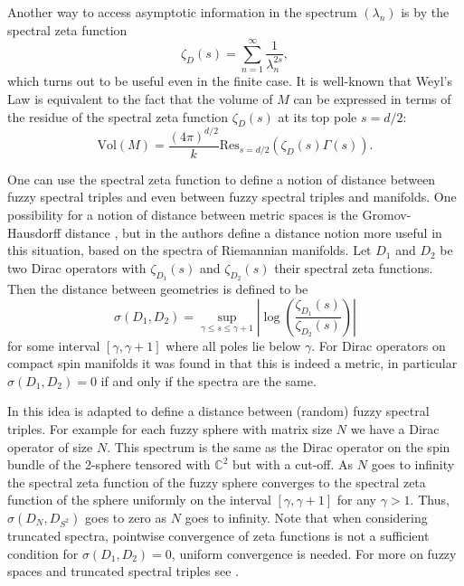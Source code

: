 \documentclass[10pt]{article}
\begin{document}
Another way to access asymptotic information in the spectrum $(\lambda_n)$ is by the spectral zeta function
$$\zeta_{D} (s)=\sum_{n=1}^{\infty} \frac{1}{\lambda_{n}^{2s}}, $$
which turns out to be useful even in the finite case.
It is well-known that Weyl's Law is equivalent to the fact that the volume of $M$ can be expressed in terms of the residue of the spectral zeta function $\zeta_{D} (s)$ at its top pole $s = d/2$:
$$ \text{Vol}(M) = \frac{(4\pi )^{d/2}}{k}\text{Res}_{s=d/2}( \zeta_{D}(s)\Gamma(s)).$$


One can use the spectral zeta function to define a notion of distance between fuzzy spectral triples and even between fuzzy spectral triples and manifolds.
One possibility for a notion of distance between metric spaces is the Gromov-Hausdorff distance \cite{Gromov}, but in \cite{Cornel} the authors define a distance notion more useful in this situation, based on the spectra of Riemannian manifolds. Let $D_{1}$ and $D_{2}$ be two Dirac operators with $\zeta_{D_1}(s)$ and $\zeta_{D_2}(s)$ their spectral zeta functions. Then the distance between geometries is defined to be 
\begin{equation}\label{spectral distance}
	\sigma (D_{1},D_{2}) = \sup_{\gamma \leq s \leq \gamma +1}\left| \log \left(\frac{\zeta_{D_1}(s)}{\zeta_{D_2}(s)}\right)\right|
\end{equation}
for some interval $[\gamma,\gamma +1]$ where all poles lie below $\gamma$. For Dirac operators on compact spin  manifolds it was found in \cite{Cornel} that this is indeed a metric, in particular $\sigma(D_{1},D_{2}) = 0$ if and only if the spectra are the same.

In \cite{Spectral estimators} this idea is adapted to define a distance between (random) fuzzy spectral triples.
For example for each fuzzy sphere with matrix size $N$ we have a Dirac operator of size $N$. This spectrum is the same as the Dirac operator on the spin bundle of the 2-sphere tensored with $\mathbb{C}^{2}$ but with a cut-off. As $N$ goes to infinity the spectral zeta function of the fuzzy sphere converges to the spectral zeta function of the sphere uniformly on the interval $[\gamma, \gamma +1]$ for any $\gamma >1$. Thus,  $\sigma(D_{N},D_{S^{2}}) $ goes to zero as $N$ goes to infinity. Note that when considering truncated spectra, pointwise convergence of zeta functions is not a sufficient condition for $\sigma(D_{1},D_{2}) = 0$, uniform convergence is needed. For more on fuzzy spaces and truncated spectral triples see \cite{truncated 1, truncated 2}.
\end{document}
